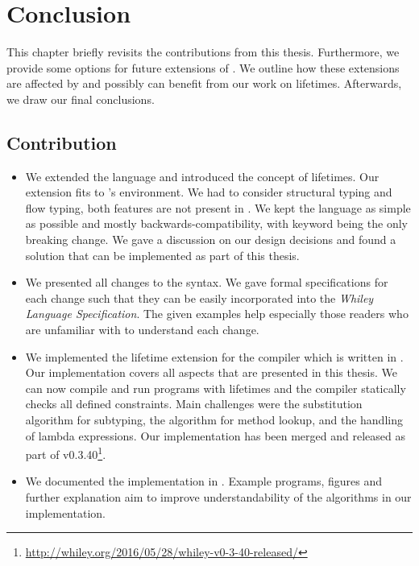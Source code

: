 \chapter{Conclusion}\label{chapter:conclusion}

This chapter briefly revisits the contributions from this thesis.
Furthermore, we provide some options for future extensions of \whiley.
We outline how these extensions are affected by and possibly can benefit from our work on lifetimes.
Afterwards, we draw our final conclusions.


\section{Contribution}
\begin{itemize}
\item We extended the \whiley language and introduced the concept of lifetimes.
Our extension fits to \whiley's environment.
We had to consider structural typing and flow typing, both features are not present in \rust.
We kept the \whiley language as simple as possible and mostly backwards-compatibility, with keyword  being the only breaking change.
We gave a discussion on our design decisions and found a solution that can be implemented as part of this thesis.

\item We presented all changes to the \whiley syntax.
We gave formal specifications for each change such that they can be easily incorporated into the \emph{Whiley Language Specification}.
The given examples help especially those readers who are unfamiliar with \whiley to understand each change.

\item We implemented the lifetime extension for the \whiley compiler which is written in \java.
Our implementation covers all aspects that are presented in this thesis.
We can now compile and run \whiley programs with lifetimes and the compiler statically checks all defined constraints.
Main challenges were the substitution algorithm for subtyping, the algorithm for method lookup, and the handling of lambda expressions.
Our implementation has been merged and released as part of \whiley v0.3.40\footnote{\url{http://whiley.org/2016/05/28/whiley-v0-3-40-released/}}.

\item We documented the implementation in .
Example programs, figures and further explanation aim to improve understandability of the algorithms in our implementation.


\end{itemize}
